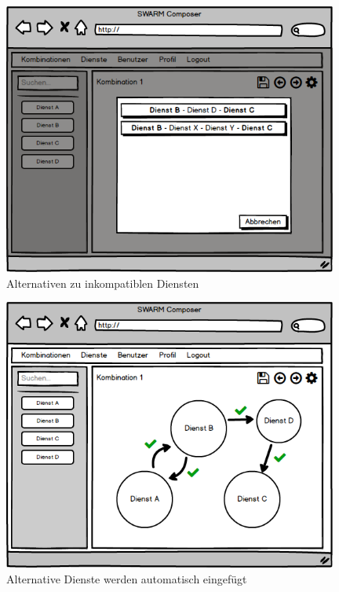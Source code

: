 \begin{figure}[ht]
	\centering
	\includegraphics[keepaspectratio,width=11cm]{img/webfrontend/Kombinationen_Alternativen.png}
	\caption{Alternativen zu inkompatiblen Diensten}
\end{figure}

\begin{figure}[ht]
	\centering
	\includegraphics[keepaspectratio,width=11cm]{img/webfrontend/Kombinationen_Details_Neu.png}
	\caption{Alternative Dienste werden automatisch eingefügt}
\end{figure}

